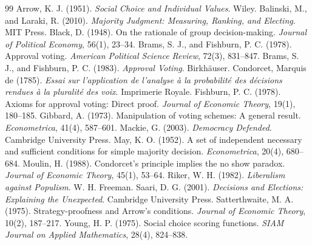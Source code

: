 \documentclass{situationist-preprint}
\begin{document}
\begin{thebibliography}{99}\small
{} Arrow, K. J. (1951). \emph{Social Choice and Individual Values}. Wiley.
 Balinski, M., and Laraki, R. (2010). \emph{Majority Judgment: Measuring, Ranking, and Electing}. MIT Press.
 Black, D. (1948). On the rationale of group decision-making. \emph{Journal of Political Economy}, 56(1), 23--34.
 Brams, S. J., and Fishburn, P. C. (1978). Approval voting. \emph{American Political Science Review}, 72(3), 831--847.
 Brams, S. J., and Fishburn, P. C. (1983). \emph{Approval Voting}. Birkh\"auser.
 Condorcet, Marquis de (1785). \emph{Essai sur l'application de l'analyse \`a la probabilit\'e des d\'ecisions rendues \`a la pluralit\'e des voix}. Imprimerie Royale.
 Fishburn, P. C. (1978). Axioms for approval voting: Direct proof. \emph{Journal of Economic Theory}, 19(1), 180--185.
 Gibbard, A. (1973). Manipulation of voting schemes: A general result. \emph{Econometrica}, 41(4), 587--601.
 Mackie, G. (2003). \emph{Democracy Defended}. Cambridge University Press.
 May, K. O. (1952). A set of independent necessary and sufficient conditions for simple majority decision. \emph{Econometrica}, 20(4), 680--684.
 Moulin, H. (1988). Condorcet's principle implies the no show paradox. \emph{Journal of Economic Theory}, 45(1), 53--64.
 Riker, W. H. (1982). \emph{Liberalism against Populism}. W. H. Freeman.
 Saari, D. G. (2001). \emph{Decisions and Elections: Explaining the Unexpected}. Cambridge University Press.
 Satterthwaite, M. A. (1975). Strategy-proofness and Arrow's conditions. \emph{Journal of Economic Theory}, 10(2), 187--217.
 Young, H. P. (1975). Social choice scoring functions. \emph{SIAM Journal on Applied Mathematics}, 28(4), 824--838.
\end{thebibliography}
\end{document}
